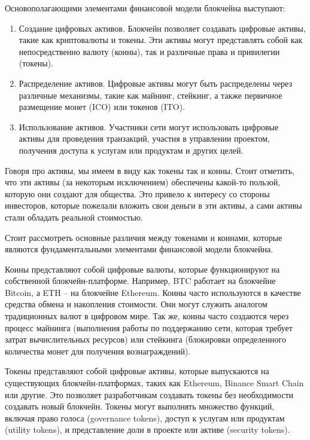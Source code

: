 Основополагающими элементами финансовой модели блокчейна выступают:

\begin{enumerate}
	\item Создание цифровых активов. Блокчейн позволяет создавать цифровые активы, такие как криптовалюты и токены. Эти активы могут представлять собой как непосредственно валюту (коины), так и различные права и привилегии (токены).

	\item Распределение активов. Цифровые активы могут быть распределены через различные механизмы, такие как майнинг, стейкинг, а также первичное размещение монет (ICO) или токенов (ITO).

	\item Использование активов. Участники сети могут использовать цифровые активы для проведения транзакций, участия в управлении проектом, получения доступа к услугам или продуктам и других целей.
\end{enumerate}

Говоря про активы, мы имеем в виду как токены так и коины. Стоит отметить, что эти активы (за некоторым исключением) обеспечены какой-то пользой, которую они создают для общества. Это привело к интересу со стороны инвесторов, которые пожелали вложить свои деньги в эти активы, а сами активы стали обладать реальной стоимостью.

Стоит рассмотреть основные различия между токенами и коинами, которые являются фундаментальными элементами финансовой модели блокчейна.

Коины представляют собой цифровые валюты, которые функционируют на собственной блокчейн-платформе. Например, BTC работает на блокчейне Bitcoin, а ETH -- на блокчейне Ethereum. Коины часто используются в качестве средства обмена и накопления стоимости. Они могут служить аналогом традиционных валют в цифровом мире. Так же, коины часто создаются через процесс майнинга (выполнения работы по поддержанию сети, которая требует затрат вычислительных ресурсов) или стейкинга (блокировки определенного количества монет для получения вознаграждений).

Токены представляют собой цифровые активы, которые выпускаются на существующих блокчейн-платформах, таких как Ethereum, Binance Smart Chain или другие. Это позволяет разработчикам создавать токены без необходимости создавать новый блокчейн. Токены могут выполнять множество функций, включая право голоса (governance tokens), доступ к услугам или продуктам (utility tokens), и представление доли в проекте или активе (security tokens).

